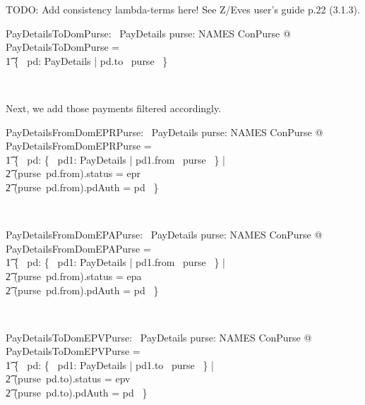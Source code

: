 TODO: Add consistency lambda-terms here! See Z/Eves user's guide p.22 (3.1.3).
\begin{LNewADef}
\begin{axdef}
   PayDetailsToDomPurse: \power~PayDetails
\where
    \forall purse: NAMES \finj ConPurse @ PayDetailsToDomPurse = \\
    \t1 \{~ pd: PayDetails | pd.to \in \dom~purse ~\}
\end{axdef}~\end{LNewADef}
%
Next, we add those payments filtered accordingly.
%
\begin{LNewADef}
\begin{axdef}
   PayDetailsFromDomEPRPurse: \power~PayDetails
\where
    \forall purse: NAMES \finj ConPurse @ PayDetailsFromDomEPRPurse = \\
    \t1 \{~ pd: \{~ pd1: PayDetails | pd1.from \in \dom~purse ~\} | \\
        \t2 (purse~pd.from).status = epr \\
        \t2 \land (purse~pd.from).pdAuth = pd ~\}
\end{axdef}~\end{LNewADef}
%
\begin{LNewADef}
\begin{axdef}
   PayDetailsFromDomEPAPurse: \power~PayDetails
\where
    \forall purse: NAMES \finj ConPurse @ PayDetailsFromDomEPAPurse = \\
    \t1 \{~ pd: \{~ pd1: PayDetails | pd1.from \in \dom~purse ~\} | \\
        \t2 (purse~pd.from).status = epa \\
        \t2 \land (purse~pd.from).pdAuth = pd ~\}
\end{axdef}~\end{LNewADef}
%
\begin{LNewADef}
\begin{axdef}
   PayDetailsToDomEPVPurse: \power~PayDetails
\where
    \forall purse: NAMES \finj ConPurse @ PayDetailsToDomEPVPurse = \\
    \t1 \{~ pd: \{~ pd1: PayDetails | pd1.to \in \dom~purse ~\} | \\
        \t2 (purse~pd.to).status = epv \land \\
        \t2 (purse~pd.to).pdAuth = pd ~\}
\end{axdef}~\end{LNewADef}
